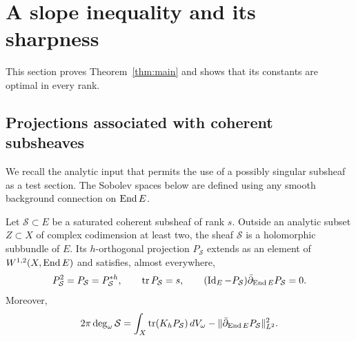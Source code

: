 \section{A slope inequality and its sharpness}\label{sec:slope}

This section proves Theorem~\ref{thm:main} and shows that its constants are
optimal in every rank.

\subsection{Projections associated with coherent subsheaves}

We recall the analytic input that permits the use of a possibly singular
subsheaf as a test section. The Sobolev spaces below are defined using any
smooth background connection on $\operatorname{End} E$.

\begin{lemma}\label{lem:projection}
Let $\mathcal S\subset E$ be a saturated coherent subsheaf of rank $s$.
Outside an analytic subset $Z\subset X$ of complex codimension at least
two, the sheaf $\mathcal S$ is a holomorphic subbundle of $E$. Its
$h$-orthogonal projection $P_{\mathcal S}$ extends as an element of
$W^{1,2}(X,\operatorname{End} E)$ and satisfies, almost everywhere,
\[
 P_{\mathcal S}^2=P_{\mathcal S}=P_{\mathcal S}^{*h},\qquad \operatorname{tr} P_{\mathcal S}=s,
 \qquad (\operatorname{Id}_E-P_{\mathcal S})\bar\partial_{\operatorname{End} E}P_{\mathcal S}=0.
\]
Moreover,
\begin{equation}\label{eq:degree}
 2\pi\deg_\omega\mathcal S
 =\int_X\operatorname{tr}(K_hP_{\mathcal S})\,dV_\omega
  -\lVert\bar\partial_{\operatorname{End} E}P_{\mathcal S}\rVert_{L^2}^2.
\end{equation}
\end{lemma}

